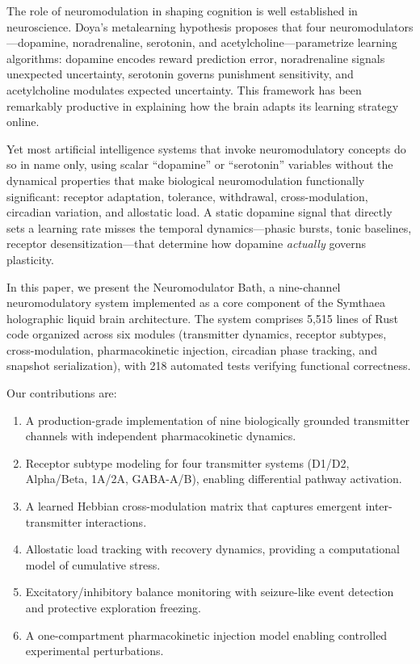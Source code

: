 \documentclass[11pt,a4paper]{article}
\begin{document}
The role of neuromodulation in shaping cognition is well established in neuroscience. Doya's metalearning hypothesis \citep{doya2002} proposes that four neuromodulators---dopamine, noradrenaline, serotonin, and acetylcholine---parametrize learning algorithms: dopamine encodes reward prediction error, noradrenaline signals unexpected uncertainty, serotonin governs punishment sensitivity, and acetylcholine modulates expected uncertainty. This framework has been remarkably productive in explaining how the brain adapts its learning strategy online.

Yet most artificial intelligence systems that invoke neuromodulatory concepts do so in name only, using scalar ``dopamine'' or ``serotonin'' variables without the dynamical properties that make biological neuromodulation functionally significant: receptor adaptation, tolerance, withdrawal, cross-modulation, circadian variation, and allostatic load. A static dopamine signal that directly sets a learning rate misses the temporal dynamics---phasic bursts, tonic baselines, receptor desensitization---that determine how dopamine \emph{actually} governs plasticity.

In this paper, we present the Neuromodulator Bath, a nine-channel neuromodulatory system implemented as a core component of the Symthaea holographic liquid brain architecture. The system comprises 5,515 lines of Rust code organized across six modules (transmitter dynamics, receptor subtypes, cross-modulation, pharmacokinetic injection, circadian phase tracking, and snapshot serialization), with 218 automated tests verifying functional correctness.

Our contributions are:

\begin{enumerate}
  \item A production-grade implementation of nine biologically grounded transmitter channels with independent pharmacokinetic dynamics.
  \item Receptor subtype modeling for four transmitter systems (D1/D2, Alpha/Beta, 1A/2A, GABA-A/B), enabling differential pathway activation.
  \item A learned Hebbian cross-modulation matrix that captures emergent inter-transmitter interactions.
  \item Allostatic load tracking with recovery dynamics, providing a computational model of cumulative stress.
  \item Excitatory/inhibitory balance monitoring with seizure-like event detection and protective exploration freezing.
  \item A one-compartment pharmacokinetic injection model enabling controlled experimental perturbations.
\end{enumerate}
\end{document}
